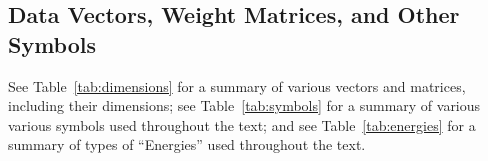 \subsection{Data Vectors, Weight Matrices, and Other Symbols}
\label{sxn:appendix_A}

See Table~\ref{tab:dimensions} for a summary of various vectors and matrices, including their dimensions;
see Table~\ref{tab:symbols} for a summary of various various symbols used throughout the text; and 
see Table~\ref{tab:energies} for a summary of types of ``Energies'' used throughout the text.


\renewcommand{\arraystretch}{1.2} %

